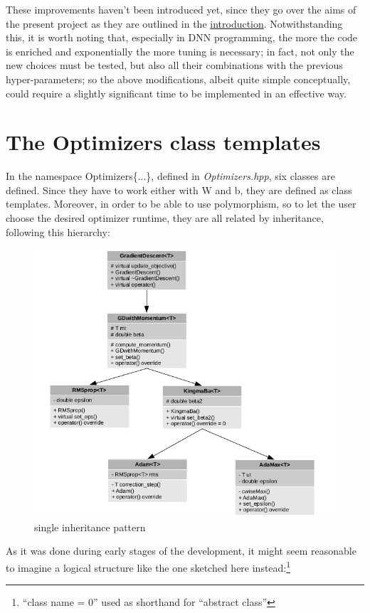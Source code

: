 \documentclass[12pt, a4paper]{report}
\theoremstyle{definition}
\begin{document}
These improvements haven't been introduced yet, since they go over the aims of the present project as they are outlined in the \hyperref[introduction]{introduction}. Notwithstanding this, it is worth noting that, especially in DNN programming, the more the code is enriched and exponentially the more tuning is necessary; in fact, not only the new choices must be tested, but also all their combinations with the previous hyper-parameters; so the above modifications, albeit quite simple conceptually, could require a slightly significant time to be implemented in an effective way.

\section{The Optimizers class templates}\label{section3.3}
In the {\ttfamily namespace Optimizers\{...\}}, defined in \textit{Optimizers.hpp}, six classes are defined. Since they have to work either with {\ttfamily W} and {\ttfamily b}, they are defined as class templates. Moreover, in order to be able to use polymorphism, so to let the user choose the desired optimizer runtime, they are all related by inheritance, following this hierarchy:
\begin{figure}[H]
	\centering
	\includegraphics[width=\textwidth]{img/classes1}
	\caption{single inheritance pattern}\label{fig9}
\end{figure}
\newpage \noindent As it was done during early stages of the development, it might seem reasonable to imagine a logical structure like the one sketched here instead:\footnote{``class name = 0'' used as shorthand for ``abstract class''}
\end{document}
